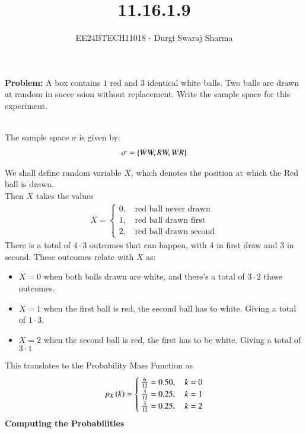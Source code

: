 \documentclass[journal]{IEEEtran}
\begin{document}

\vspace{3cm}

\title{11.16.1.9}
\author{EE24BTECH11018 - Durgi Swaraj Sharma}

{\let\newpage\relax\maketitle}
\renewcommand{\thefigure}{\theenumi}
\renewcommand{\thetable}{\theenumi}
\setlength{\intextsep}{10pt}
\renewcommand{\thetable}{\theenumi}
\textbf{Problem:} A box contains $1$ red and $3$ identical white balls. Two balls are drawn at random in succe
ssion without replacement. Write the sample space for this experiment.\\
\\
\solution

The sample space $\sigma$ is given by:
\begin{align}
  \sigma = \left\{WW, RW, WR\right\}
\end{align}

We shall define random variable $X$, which denotes the position at which the Red ball is drawn. \\
Then $X$ takes the values
\begin{align}
  X = 
  \begin{cases}
    0 ,&\, \text{red ball never drawn}\\
    1 ,&\, \text{red ball drawn first}\\
    2 ,&\, \text{red ball drawn second}
  \end{cases}
\end{align}
There is a total of $4\cdot3$ outcomes that can happen, with $4$ in first draw and $3$ in second.
These outcomes relate with $X$ as:
\begin{itemize}
  \item $X=0$ when both balls drawn are white, and there's a total of $3\cdot2$ these outcomes.
  \item $X=1$ when the first ball is red, the second ball has to white. Giving a total of $1\cdot3$.
  \item $X=2$ when the second ball is red, the first has to be white. Giving a total of $3\cdot1$
\end{itemize}
This translates to the Probability Mass Function as 
\begin{align}
  p_X\left(k\right) = 
  \begin{cases}
    \frac{6}{12} = 0.50,\,& k = 0\\
    \frac{3}{12} = 0.25,\,& k = 1\\
    \frac{3}{12} = 0.25,\,& k = 2
  \end{cases}
\end{align}
\textbf{Computing the Probabilities}
\end{document}
